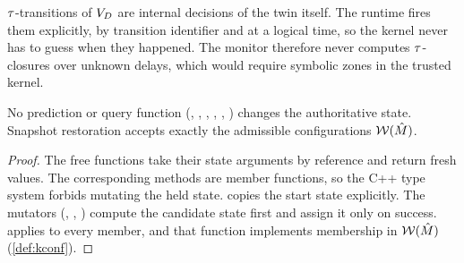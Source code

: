 \begin{remark}\label{rem:tau}
$\tau$-transitions of $V_D$ are internal decisions of the twin itself. The
runtime fires them explicitly, by transition identifier and at a logical time,
so the kernel never has to guess when they happened. The monitor therefore
never computes $\tau$-closures over unknown delays, which would require
symbolic zones in the trusted kernel.
\end{remark}

\begin{proposition}\label{prop:nointerf}
No prediction or query function (, ,
, , , )
changes the authoritative state. Snapshot restoration accepts exactly the
admissible configurations $\mathcal{W}(\hat M)$.
\end{proposition}
\begin{proof}
The free functions take their state arguments by  reference and
return fresh values. The corresponding  methods are
 member functions, so the C++ type system forbids mutating the
held state.  copies the start state explicitly. The mutators
(, , ) compute the candidate state
first and assign it only on success.  applies
 to every member, and that function implements
membership in $\mathcal{W}(\hat M)$ (\cref{def:kconf}).
\end{proof}
